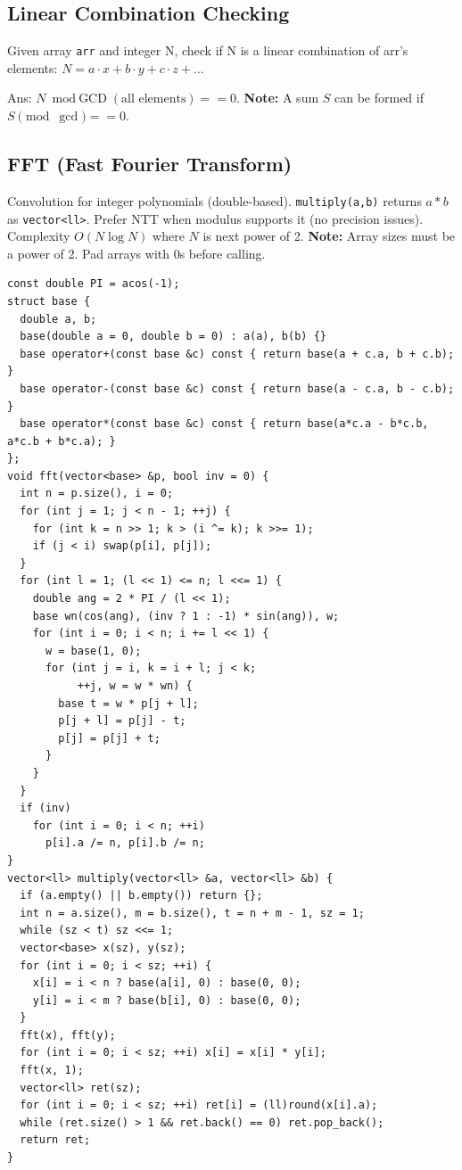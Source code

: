\subsection{Linear Combination Checking}
Given array \texttt{arr} and integer N, check if N is
a linear combination of arr's elements:
$N = a \cdot x + b \cdot y + c \cdot z + \ldots$

Ans: $N \bmod \text{GCD}(\text{all elements}) == 0$.
\textbf{Note:} A sum $S$ can be formed if $S \pmod{\gcd} == 0$.

\subsection{FFT (Fast Fourier Transform)}
Convolution for integer polynomials (double-based). \texttt{multiply(a,b)} returns $a * b$ as \texttt{vector<ll>}.
Prefer NTT when modulus supports it (no precision issues). Complexity $O(N \log N)$ where $N$ is next power of 2.
\textbf{Note:} Array sizes must be a power of 2. Pad arrays with 0s before calling.
\begin{verbatim}
const double PI = acos(-1);
struct base {
  double a, b;
  base(double a = 0, double b = 0) : a(a), b(b) {}
  base operator+(const base &c) const { return base(a + c.a, b + c.b); }
  base operator-(const base &c) const { return base(a - c.a, b - c.b); }
  base operator*(const base &c) const { return base(a*c.a - b*c.b, a*c.b + b*c.a); }
};
void fft(vector<base> &p, bool inv = 0) {
  int n = p.size(), i = 0;
  for (int j = 1; j < n - 1; ++j) {
    for (int k = n >> 1; k > (i ^= k); k >>= 1);
    if (j < i) swap(p[i], p[j]);
  }
  for (int l = 1; (l << 1) <= n; l <<= 1) {
    double ang = 2 * PI / (l << 1);
    base wn(cos(ang), (inv ? 1 : -1) * sin(ang)), w;
    for (int i = 0; i < n; i += l << 1) {
      w = base(1, 0);
      for (int j = i, k = i + l; j < k;
           ++j, w = w * wn) {
        base t = w * p[j + l];
        p[j + l] = p[j] - t;
        p[j] = p[j] + t;
      }
    }
  }
  if (inv)
    for (int i = 0; i < n; ++i)
      p[i].a /= n, p[i].b /= n;
}
vector<ll> multiply(vector<ll> &a, vector<ll> &b) {
  if (a.empty() || b.empty()) return {};
  int n = a.size(), m = b.size(), t = n + m - 1, sz = 1;
  while (sz < t) sz <<= 1;
  vector<base> x(sz), y(sz);
  for (int i = 0; i < sz; ++i) {
    x[i] = i < n ? base(a[i], 0) : base(0, 0);
    y[i] = i < m ? base(b[i], 0) : base(0, 0);
  }
  fft(x), fft(y);
  for (int i = 0; i < sz; ++i) x[i] = x[i] * y[i];
  fft(x, 1);
  vector<ll> ret(sz);
  for (int i = 0; i < sz; ++i) ret[i] = (ll)round(x[i].a);
  while (ret.size() > 1 && ret.back() == 0) ret.pop_back();
  return ret;
}
\end{verbatim}
